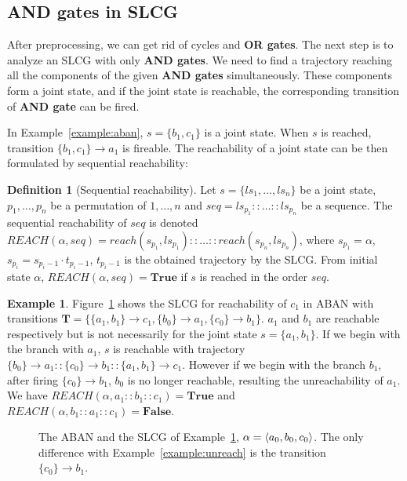 \documentclass{article}
\newcommand{\acm}[3]{\{#1\}\rightarrow#3}
\newcommand{\ac}[3]{$\{#1\}\rightarrow#3$}
\theoremstyle{definition}
\newtheorem{definition}{Definition}
\newtheorem{example}{Example}
\DeclarePairedDelimiter{\init}{\langle}{\rangle}
\begin{document}
\subsection{AND gates in SLCG}\label{sectAndGates}
After preprocessing, we can get rid of cycles and \textbf{OR gates}.
The next step is to analyze an SLCG with only \textbf{AND gates}.
We need to find a trajectory reaching all the components of the given \textbf{AND gates} simultaneously.
These components form a joint state, and if the joint state is reachable, the corresponding transition of \textbf{AND gate} can be fired. 

In Example~\ref{example:aban}, $s=\{ b_1,c_1\}$ is a joint state.
When $s$ is reached, transition \ac{b_1,c_1}{a_0}{a_1} is fireable.
The reachability of a joint state can be then formulated by sequential reachability:
\begin{definition}[Sequential reachability]
Let $s=\{ls_1,\ldots,ls_n\}$ be a joint state, $p_1,\ldots ,p_n$ be a permutation of $1,\ldots ,n$ and $seq=ls_{p_1}::\ldots::ls_{p_n}$ be a sequence.
The sequential reachability of $seq$ is denoted %
$REACH(\alpha,seq)=reach(s_{p_1},ls_{p_1})::\ldots::reach(s_{p_n},ls_{p_n})$, where $s_{p_1}=\alpha$, $s_{p_i}=s_{p_i-1}\cdot t_{p_i-1}$, $t_{p_i-1}$ is the obtained trajectory by the SLCG.
From initial state $\alpha$, $REACH(\alpha,seq)=\mathbf{True}$ if $s$ is reached in the order $seq$.
\end{definition}

\begin{example}\label{example:order}
Figure~\ref{fig:5} shows the SLCG for reachability of $c_1$ in ABAN with transitions $\mathbf{T}=\{\acm{a_1,b_1}{c_0}{c_1},\acm{b_0}{a_0}{a_1},\acm{c_0}{b_0}{b_1}\}$.
$a_1$ and $b_1$ are reachable respectively but is not necessarily for the joint state $s=\{a_1,b_1\}$.
If we begin with the branch with $a_1$, $s$ is reachable with trajectory $\acm{b_0}{a_0}{a_1}::\acm{c_0}{b_0}{b_1}::\acm{a_1,b_1}{c_0}{c_1}$. 
However if we begin with the branch $b_1$, after firing $\acm{c_0}{b_0}{b_1}$, $b_0$ is no longer reachable, resulting the unreachability of $a_1$.
We have $REACH(\alpha,a_1::b_1::c_1)=\mathbf{True}$ and $REACH(\alpha,b_1::a_1::c_1)=\mathbf{False}$.
\end{example}
\begin{figure}[ht]
\centering

\caption{The ABAN and the SLCG of Example~\ref{example:order}, $\alpha=\init{ a_0,b_0,c_0}$. 
The only difference with Example~\ref{example:unreach} is the transition \ac{c_0}{b_0}{b_1}.
}
\label{fig:5}
\end{figure}
\end{document}
